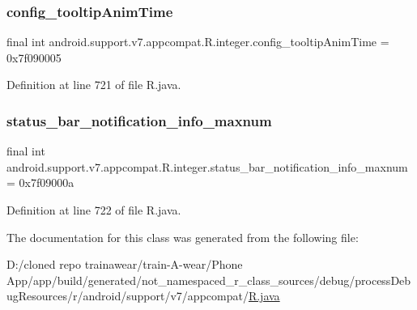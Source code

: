 \subsubsection{\texorpdfstring{config\_tooltipAnimTime}{config\_tooltipAnimTime}}
{\footnotesize\ttfamily final int android.\+support.\+v7.\+appcompat.\+R.\+integer.\+config\+\_\+tooltip\+Anim\+Time = 0x7f090005\hspace{0.3cm}{\ttfamily [static]}}



Definition at line 721 of file R.\+java.

\mbox{\label{classandroid_1_1support_1_1v7_1_1appcompat_1_1_r_1_1integer_a52a3923b3d9ba3b58e218794b30683dc}} 
\subsubsection{\texorpdfstring{status\_bar\_notification\_info\_maxnum}{status\_bar\_notification\_info\_maxnum}}
{\footnotesize\ttfamily final int android.\+support.\+v7.\+appcompat.\+R.\+integer.\+status\+\_\+bar\+\_\+notification\+\_\+info\+\_\+maxnum = 0x7f09000a\hspace{0.3cm}{\ttfamily [static]}}



Definition at line 722 of file R.\+java.



The documentation for this class was generated from the following file\+:\begin{DoxyCompactItemize}
\item 
D\+:/cloned repo trainawear/train-\/\+A-\/wear/\+Phone App/app/build/generated/not\+\_\+namespaced\+\_\+r\+\_\+class\+\_\+sources/debug/process\+Debug\+Resources/r/android/support/v7/appcompat/\mbox{\hyperlink{process_debug_resources_2r_2android_2support_2v7_2appcompat_2_r_8java}{R.\+java}}\end{DoxyCompactItemize}

